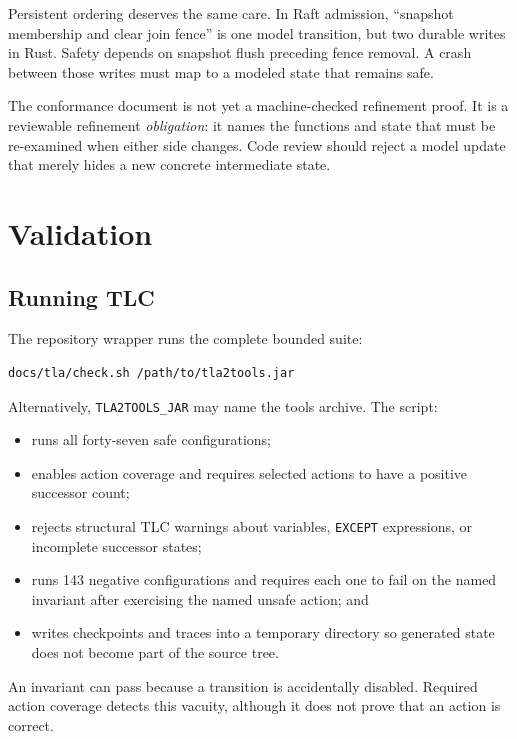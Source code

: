 Persistent ordering deserves the same care. In Raft admission, ``snapshot
membership and clear join fence'' is one model transition, but two durable
writes in Rust. Safety depends on snapshot flush preceding fence removal. A
crash between those writes must map to a modeled state that remains safe.

The conformance document is not yet a machine-checked refinement proof. It is
a reviewable refinement \emph{obligation}: it names the functions and state
that must be re-examined when either side changes. Code review should reject a
model update that merely hides a new concrete intermediate state.

\section{Validation}

\subsection{Running TLC}

The repository wrapper runs the complete bounded suite:

\begin{verbatim}
docs/tla/check.sh /path/to/tla2tools.jar
\end{verbatim}

Alternatively, \texttt{TLA2TOOLS\_JAR} may name the tools archive. The script:

\begin{itemize}
    \item runs all forty-seven safe configurations;
    \item enables action coverage and requires selected actions to have a
        positive successor count;
    \item rejects structural TLC warnings about variables, \texttt{EXCEPT}
        expressions, or incomplete successor states;
    \item runs 143 negative configurations and requires each one to fail on
        the named invariant after exercising the named unsafe action; and
    \item writes checkpoints and traces into a temporary directory so generated
        state does not become part of the source tree.
\end{itemize}

An invariant can pass because a transition is accidentally disabled. Required
action coverage detects this vacuity, although it does not prove that an action
is correct.

